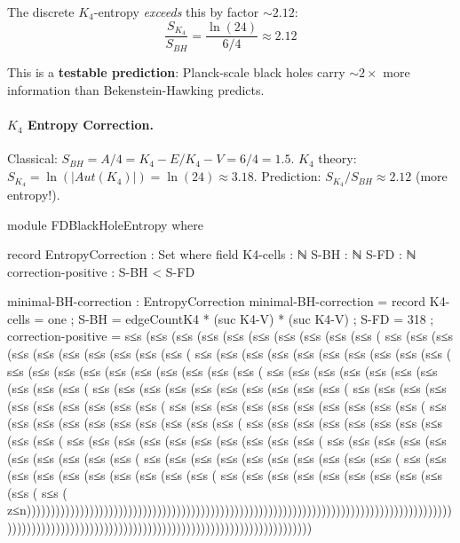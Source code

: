 \documentclass[11pt,a4paper]{book}
\def\mathrm#1{#1}%
\def\text#1{#1}%
\begin{document}
The discrete $K_4$-entropy \emph{exceeds} this by factor $\sim 2.12$:
$$\frac{S_{K_4}}{S_{BH}} = \frac{\ln(24)}{6/4} \approx 2.12$$

This is a \textbf{testable prediction}: Planck-scale black holes carry $\sim 2\times$ more information than Bekenstein-Hawking predicts.

\paragraph{$K_4$ Entropy Correction.}
Classical: $S_{BH} = A/4 = K_4\text{-}E / K_4\text{-}V = 6/4 = 1.5$.
$K_4$ theory: $S_{K_4} = \ln(|\mathrm{Aut}(K_4)|) = \ln(24) \approx 3.18$.
Prediction: $S_{K_4}/S_{BH} \approx 2.12$ (more entropy!).

\begin{code}
module FDBlackHoleEntropy where

  record EntropyCorrection : Set where
    field
      K4-cells : ℕ
      S-BH : ℕ
      S-FD : ℕ
      correction-positive : S-BH < S-FD
      
  minimal-BH-correction : EntropyCorrection
  minimal-BH-correction = record
    { K4-cells = one
    ; S-BH = edgeCountK4 * (suc K4-V) * (suc K4-V)
    ; S-FD = 318
    ; correction-positive = s≤s (s≤s (s≤s (s≤s (s≤s (s≤s (s≤s (s≤s (s≤s (s≤s (
                           s≤s (s≤s (s≤s (s≤s (s≤s (s≤s (s≤s (s≤s (s≤s (s≤s (
                           s≤s (s≤s (s≤s (s≤s (s≤s (s≤s (s≤s (s≤s (s≤s (s≤s (
                           s≤s (s≤s (s≤s (s≤s (s≤s (s≤s (s≤s (s≤s (s≤s (s≤s (
                           s≤s (s≤s (s≤s (s≤s (s≤s (s≤s (s≤s (s≤s (s≤s (s≤s (
                           s≤s (s≤s (s≤s (s≤s (s≤s (s≤s (s≤s (s≤s (s≤s (s≤s (
                           s≤s (s≤s (s≤s (s≤s (s≤s (s≤s (s≤s (s≤s (s≤s (s≤s (
                           s≤s (s≤s (s≤s (s≤s (s≤s (s≤s (s≤s (s≤s (s≤s (s≤s (
                           s≤s (s≤s (s≤s (s≤s (s≤s (s≤s (s≤s (s≤s (s≤s (s≤s (
                           s≤s (s≤s (s≤s (s≤s (s≤s (s≤s (s≤s (s≤s (s≤s (s≤s (
                           s≤s (s≤s (s≤s (s≤s (s≤s (s≤s (s≤s (s≤s (s≤s (s≤s (
                           s≤s (s≤s (s≤s (s≤s (s≤s (s≤s (s≤s (s≤s (s≤s (s≤s (
                           s≤s (s≤s (s≤s (s≤s (s≤s (s≤s (s≤s (s≤s (s≤s (s≤s (
                           s≤s (s≤s (s≤s (s≤s (s≤s (s≤s (s≤s (s≤s (s≤s (s≤s (
                           s≤s (s≤s (s≤s (s≤s (s≤s (s≤s (s≤s (s≤s (s≤s (s≤s (
                           s≤s (
                           z≤n)))))))))))))))))))))))))))))))))))))))))))))))))))))))))))))))))))))))))))))))))))))))))))))))))))))))))))))))))))))))))))))))))))))))))))))))))))))))
    }
  

\end{code}
\end{document}

